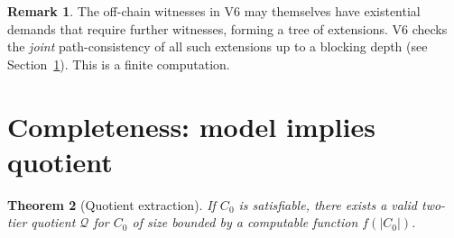 \documentclass[a4paper,11pt]{article}
\newtheorem{theorem}{Theorem}[section]
\theoremstyle{definition}
\newtheorem{remark}[theorem]{Remark}
\begin{document}
\begin{remark}
The off-chain witnesses in V6 may themselves have existential demands
that require further witnesses, forming a tree of extensions.  V6
checks the \emph{joint} path-consistency of all such extensions up to
a blocking depth (see Section~\ref{sec:completeness}).  This is a
finite computation.
\end{remark}


\section{Completeness: model implies quotient}
\label{sec:completeness}

\begin{theorem}[Quotient extraction]\label{thm:completeness}
If $C_0$ is satisfiable, there exists a valid two-tier quotient
$\mathcal{Q}$ for $C_0$ of size bounded by a computable function
$f(|C_0|)$.
\end{theorem}
\end{document}
